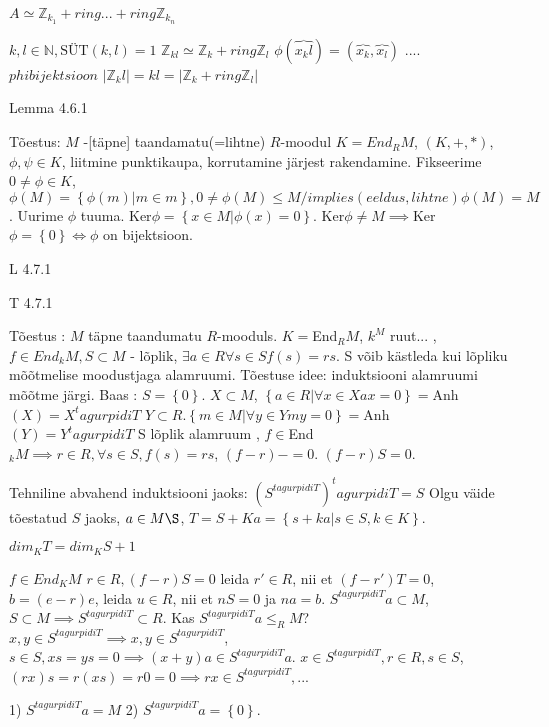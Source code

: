 \documentclass[12pt]{report}
\numberwithin{equation}{section}
\theoremstyle{definition}
\theoremstyle{plain}
\begin{document}
$A \simeq \mathbb{Z}_{k_1} +ring ... +ring \mathbb{Z}_{k_n}$

$k,l \in \mathbb{N}, \text{S\"UT}(k,l)=1$
$\mathbb{Z}_{kl} \simeq \mathbb{Z}_k +ring \mathbb{Z}_l$
$\phi(\overbrace{x_kl}) = (\overbrace{x_k},\overbrace{x_l})$
....
$phi bijektsioon$ 
$|\mathbb{Z}_kl| = kl = |\mathbb{Z}_k +ring \mathbb{Z}_l|$

Lemma 4.6.1

Tõestus:
$M$ -[täpne] taandamatu(=lihtne) $R$-moodul
$ K = End_{R}M $, $(K,+,*)$, $ \phi,\psi \in K $, liitmine punktikaupa, korrutamine järjest rakendamine. 
Fikseerime $0 \neq \phi \in K$, $\phi(M) = \left\{ \phi(m) | m \in m \right\}, {0} \neq \phi(M) \leq M /implies (eeldus, lihtne) \phi(M) = M$. Uurime $\phi$ tuuma. Ker$\phi = \left\{x \in M | \phi(x) = 0 \right\}$. Ker$\phi \neq M \implies $Ker$\phi = \left\{ 0 \right\} \iff \phi $ on bijektsioon.

 L 4.7.1
 
 T 4.7.1
 
 Tõestus : $M$ täpne taandumatu $R$-mooduls.
 $K = $End$_{R}M$, $k^M$ ruut... , $f \in End_{k}M, S \subset M$ - lõplik, $\exists a \in R \forall s \in S f(s) = rs$. S võib kästleda kui lõpliku mõõtmelise moodustjaga alamruumi. 
 Tõestuse idee: induktsiooni alamruumi mõõtme järgi. Baas : $S = \left\{ 0 \right\}$.
 $X \subset M$, $\left\{ a \in R | \forall x \in X ax = 0 \right\} = $Anh$(X) = X^tagurpidiT$
 $ Y \subset R$.$\left\{ m \in M | \forall y \in Y my = 0 \right\} = $Anh$(Y) = Y^tagurpidiT$
 S lõplik alamruum , $f \in$End$_{k}M \implies r \in R, \forall s \in S, f(s) = rs$, $(f - r)- = 0$. $(f-r)S = 0$. 
 
Tehniline abvahend induktsiooni jaoks: $(S^{tagurpidiT})^tagurpidiT =S$
Olgu väide tõestatud $S$ jaoks, $a \in M\S$, $T = S + Ka = \left\lbrace s + ka | s \in S, k \in K \right\rbrace$.
 
$dim_{K}T = dim_{K}S+1$

$f \in End_{K}M$
$r \in R, (f - r)S = 0$
leida $r' \in R$, nii et $(f - r')T = 0$, $b = (e -r)e$, leida $u \in R$, nii et $nS = 0 $ ja
$ na = b $. $S^{tagurpidiT}a \subset M$, $S \subset M \implies S^{tagurpidiT} \subset R$. 
Kas $S^{tagurpidiT}a \leq_R M$? $x,y \in S^{tagurpidiT} \implies x,y \in S^{tagurpidiT}$, $s \in S, xs = ys = 0 \implies (x + y)a \in S^{tagurpidiT}a$.
$x \in S^{tagurpidiT}, r \in R, s \in S$, $(rx)s = r(xs) = r0 = 0 \implies rx \in S^{tagurpidiT}, ...$ 

1) $S^{tagurpidiT} a = M$
2) $S^{tagurpidiT} a = \left\lbrace 0 \right\rbrace$. 
\end{document}
